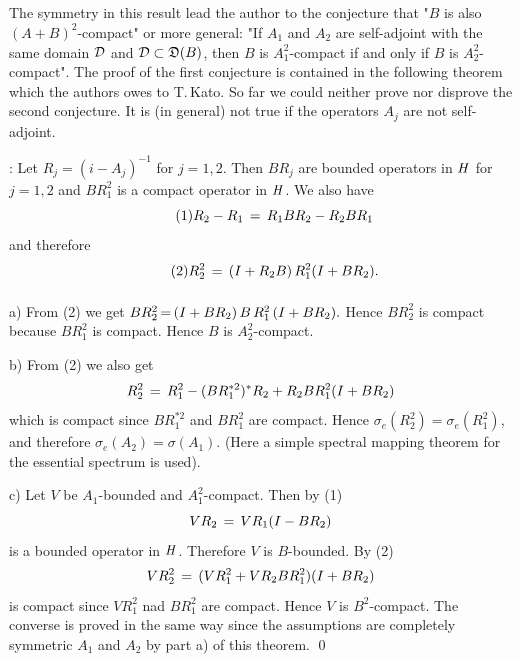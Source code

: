 \documentclass[11pt,twoside]{article}
\begin{document}
\subparagraph*{}
The symmetry in this result lead the author to the conjecture
that "$B$ is also $(A+B)^2$-compact" or more general:
"If $A_1$ and $A_2$ are self-adjoint with the same domain $\cal{D}$ and
$\cal{D} \subset \domain{B}$,
then $B$ is $A_1^2$-compact if and only if $B$ is $A_2^2$-compact".
The proof of the first conjecture is contained in the following theorem
which the authors owes to T.\,Kato.
So far we could neither prove nor disprove the second conjecture.
It is (in general) not true if the operators $A_j$ are not self-adjoint.


\Proof:
Let $R_j = (i-A_j)^{-1}$ for $j=1,2$.
Then $B R_j$ are bounded operators in $\hilH$ for $j=1,2$ and $B R_1^2$
is a compact operator in $\hilH$.
We also have
\begin{equation}\tag{1}
R_2 - R_1 \= R_1 B R_2 - R_2 B R_1
\end{equation}
and therefore
\begin{equation}\tag{2}
R_2^2 \= (I + R_2 B) \, R_1^2 (I + B R_2).
\end{equation}

\paragraph{}
a) From (2) we get $BR_2^2 \eq (I + B R_2) \, B \, R_1^2 \, (I+BR_2).$
Hence $BR_2^2$ is compact because $BR_1^2$ is compact.
Hence $B$ is $A_2^2$-compact.

b) From (2) we also get
\[
R_2^2 \= R_1^2 -(BR_1^{*2})^*R_2 + R_2BR_1^2(I+BR_2)
\]
which is compact since $BR_1^{*2}$ and $BR_1^2$ are compact.
Hence $\sigma_e(R_2^2) = \sigma_e(R_1^2)$,
and therefore $\sigma_e(A_2) = \sigma(A_1)$.
(Here a simple spectral mapping theorem for the essential spectrum is used).

c) Let $V$ be $A_1$-bounded and $A_1^2$-compact.
Then by (1)
\[
VR_2 \= VR_1(I-BR_2)
\]
is a bounded operator in $\hilH$.
Therefore $V$ is $B$-bounded. By (2)
\[
VR_2^2 \= (VR_1^2 + VR_2BR_1^2)(I + BR_2)
\]
is compact since $VR_1^2$ nad $BR_1^2$ are compact.
Hence $V$ is $B^2$-compact.
The converse is proved in the same way since the assumptions are completely
symmetric {\wrt} $A_1$ and $A_2$ by part a) of this theorem. \qed
\end{document}

